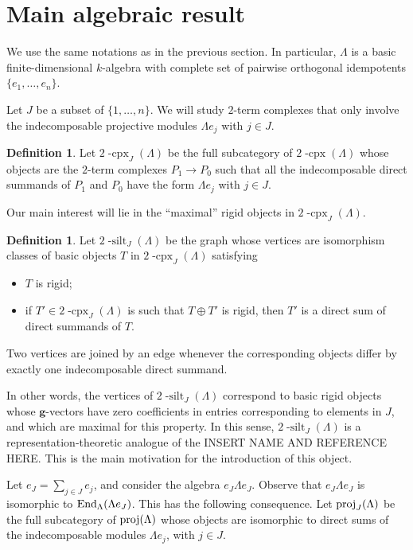 \documentclass{amsart}
\theoremstyle{definition}
\newtheorem{definition}[theorem]{Definition}
\renewcommand{\b}[1]{\mathbf{#1}} %
\newcommand{\cpx}{2 \! \operatorname{-cpx}}
\newcommand{\silt}{2 \! \operatorname{-silt}}
\newcommand{\proj}{\operatorname{{\rm proj }}}
\newcommand{\End}[1]{\operatorname{\rm End}_{#1}}
\begin{document}

\section{Main algebraic result}

We use the same notations as in the previous section.  In particular, $\Lambda$ is a basic finite-dimensional $k$-algebra
with complete set of pairwise orthogonal idempotents $\{e_1, \ldots, e_n\}$.

Let $J$ be a subset of $\{1, \ldots, n\}$.  
We will study $2$-term complexes that only involve the indecomposable projective modules $\Lambda e_j$ with $j\in J$.

\begin{definition}
 Let $\cpx_J(\Lambda)$ be the full subcategory of $\cpx(\Lambda)$ whose objects are the $2$-term complexes $P_1\to P_0$
 such that all the indecomposable direct summands of $P_1$ and $P_0$ have the form $\Lambda e_j$ with $j\in J$.
\end{definition}

Our main interest will lie in the ``maximal'' rigid objects in $\cpx_J(\Lambda)$.

\begin{definition}
 Let $\silt_J(\Lambda)$ be the graph whose vertices are isomorphism classes of basic objects $T$ in $\cpx_J(\Lambda)$ satisfying
   \begin{itemize}
    \item $T$ is rigid;
    \item if $T'\in \cpx_J(\Lambda)$ is such that $T\oplus T'$ is rigid, then $T'$ is a direct sum of direct summands of $T$.
   \end{itemize}
 Two vertices are joined by an edge whenever the corresponding objects differ by exactly one indecomposable direct summand.
\end{definition}

In other words, the vertices of $\silt_J(\Lambda)$ correspond to basic rigid objects whose $\b{g}$-vectors have zero coefficients in entries 
corresponding to elements in $J$, and which are maximal for this property.
In this sense, $\silt_J(\Lambda)$ is a representation-theoretic analogue of the INSERT NAME AND REFERENCE HERE.
This is the main motivation for the introduction of this object.

Let $e_J = \sum_{j\in J} e_j$, and consider the algebra $e_J \Lambda e_J$.  
Observe that $e_J \Lambda e_J$ is isomorphic to $\End{\Lambda}(\Lambda e_J)$.  This has the following consequence.
Let $\proj_J(\Lambda)$ be the full subcategory of $\proj(\Lambda)$ whose objects are isomorphic to direct sums of
the indecomposable modules $\Lambda e_j$, with $j\in J$.
\end{document}
